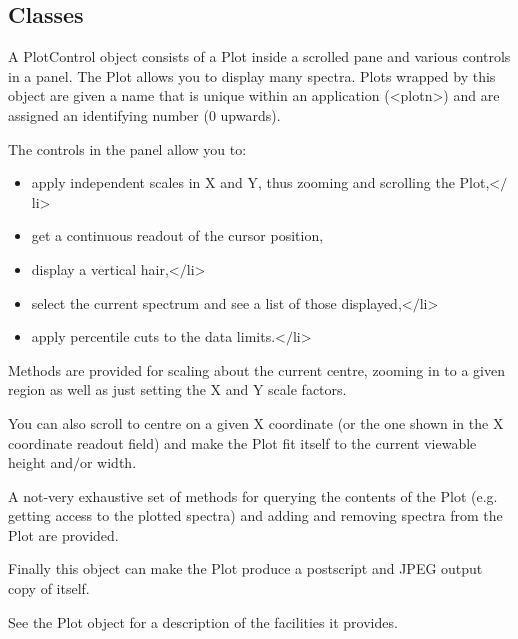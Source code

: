 \subsection{Classes}




\vspace{.09in}


{A PlotControl object consists of a Plot inside a scrolled pane and
 various controls in a panel. The Plot allows you to display many
 spectra. Plots wrapped by this object are given a name that is
 unique within an application (\textless plotn\textgreater ) and are assigned an
 identifying number (0 upwards).
 
 The controls in the panel allow you to:
 \begin{itemize}
 \item{ apply independent scales in X and Y, thus zooming and
        scrolling the Plot,\textless $/$li\textgreater 
 }
   \item{  get a continuous readout of the cursor position,
   }
\item{  display a vertical hair,\textless $/$li\textgreater 
   }
\item{  select the current spectrum and see a list of those
        displayed,\textless $/$li\textgreater 
   }
\item{  apply percentile cuts to the data limits.\textless $/$li\textgreater 
 }
\end{itemize}

 Methods are provided for scaling about the current centre, zooming
 in to a given region as well as just setting the X and Y scale
 factors.
 
 You can also scroll to centre on a given X coordinate (or the one
 shown in the X coordinate readout field) and make the Plot fit
 itself to the current viewable height and$/$or width.
 
 A not-very exhaustive set of methods for querying the contents of
 the Plot (e.g. getting access to the plotted spectra) and adding
 and removing spectra from the Plot are provided.
 
 Finally this object can make the Plot produce a postscript and JPEG
 output copy of itself.
 
 See the Plot object for a description of the facilities it
 provides.}

